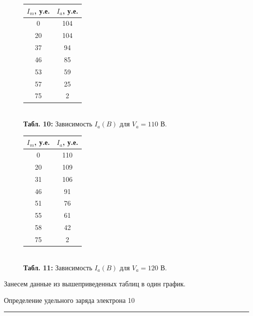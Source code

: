\documentclass[12pt,a4paper]{scrartcl}
\begin{document}
		\begin{figure}[h]
	\begin{minipage}{0.5\linewidth}
	\begin{center}
\begin{tabular}{|c|c|}
\hline
$I_m$, у.е. & $I_a$, у.е. \\ \hline
0 & 104  \\ \hline
20 & 104  \\ \hline
37 & 94  \\ \hline
46 & 85  \\ \hline
53 & 59  \\ \hline
57 & 25  \\ \hline
75 & 2  \\ \hline
\end{tabular}\\
\textbf{Табл. 10:} Зависимость $I_a(B)$ для $V_a = 110$ В.
\end{center}
	\end{minipage}
	\begin{minipage}{0.5\linewidth}
	\begin{center}
\begin{tabular}{|c|c|}
\hline
$I_m$, у.е. & $I_a$, у.е. \\ \hline
0 & 110  \\ \hline
20 & 109  \\ \hline
31 & 106  \\ \hline
46 & 91  \\ \hline
51 & 76  \\ \hline
55 & 61  \\ \hline
58 & 42  \\ \hline
75 & 2  \\ \hline
\end{tabular}\\
\textbf{Табл. 11:} Зависимость $I_a(B)$ для $V_a = 120$ В.
\end{center}
	\end{minipage}
	\end{figure}
	
	Занесем данные из вышеприведенных таблиц в один график.
	
		\newpage
	
	\begin{flushleft}
		\footnotesize{Определение удельного заряда электрона} \hspace{\fill} \footnotesize{10}
		\\[-0.3cm]\noindent\rule{\textwidth}{0.3pt}
	\end{flushleft}
	
\end{document}

